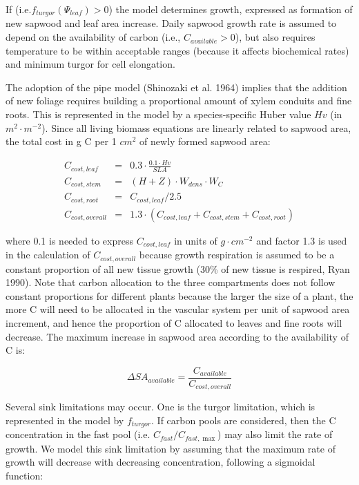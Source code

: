 \documentclass[]{book}
\begin{document}
If (i.e.\(f_{turgor}(\Psi_{leaf})>0\)) the model determines growth,
expressed as formation of new sapwood and leaf area increase. Daily
sapwood growth rate is assumed to depend on the availability of carbon
(i.e., \(C_{available}>0\)), but also requires temperature to be within
acceptable ranges (because it affects biochemical rates) and minimum
turgor for cell elongation.

The adoption of the pipe model (Shinozaki et al. 1964) implies that the
addition of new foliage requires building a proportional amount of xylem
conduits and fine roots. This is represented in the model by a
species-specific Huber value \(Hv\) (in \(m^2·m^{-2}\)). Since all
living biomass equations are linearly related to sapwood area, the total
cost in g C per 1 \(cm^2\) of newly formed sapwood area:

\begin{eqnarray}
C_{cost,leaf} &=& 0.3 \cdot \frac{0.1\cdot Hv}{SLA}\\
C_{cost,stem} &=& (H + Z) \cdot W_{dens} \cdot W_{C}\\
C_{cost,root} &=& C_{cost,leaf}/2.5\\
C_{cost,overall} &=& 1.3 \cdot (C_{cost,leaf}+C_{cost,stem} + C_{cost,root})
\end{eqnarray}

where 0.1 is needed to express \(C_{cost,leaf}\) in units of
\(g · cm^{-2}\) and factor 1.3 is used in the calculation of
\(C_{cost,overall}\) because growth respiration is assumed to be a
constant proportion of all new tissue growth (30\% of new tissue is
respired, Ryan 1990). Note that carbon allocation to the three
compartments does not follow constant proportions for different plants
because the larger the size of a plant, the more C will need to be
allocated in the vascular system per unit of sapwood area increment, and
hence the proportion of C allocated to leaves and fine roots will
decrease. The maximum increase in sapwood area according to the
availability of C is:

\begin{equation}
\Delta SA_{available} = \frac{C_{available}}{C_{cost,overall}}
\end{equation}

Several sink limitations may occur. One is the turgor limitation, which
is represented in the model by \(f_{turgor}\). If carbon pools are
considered, then the C concentration in the fast pool (i.e.
\(C_{fast}/C_{fast, \max}\)) may also limit the rate of growth. We model
this sink limitation by assuming that the maximum rate of growth will
decrease with decreasing concentration, following a sigmoidal function:
\end{document}

